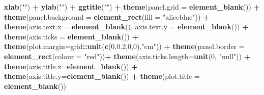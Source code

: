 \documentclass[12pt,twoside]{reedthesis}
\newenvironment{Shaded}{\begin{snugshade}}{\end{snugshade}}
\newcommand{\DataTypeTok}[1]{\textcolor[rgb]{0.13,0.29,0.53}{#1}}
\newcommand{\DecValTok}[1]{\textcolor[rgb]{0.00,0.00,0.81}{#1}}
\newcommand{\FloatTok}[1]{\textcolor[rgb]{0.00,0.00,0.81}{#1}}
\newcommand{\KeywordTok}[1]{\textcolor[rgb]{0.13,0.29,0.53}{\textbf{#1}}}
\newcommand{\NormalTok}[1]{#1}
\newcommand{\OperatorTok}[1]{\textcolor[rgb]{0.81,0.36,0.00}{\textbf{#1}}}
\newcommand{\StringTok}[1]{\textcolor[rgb]{0.31,0.60,0.02}{#1}}
\begin{document}
\begin{Shaded}
\begin{Highlighting}[]
\StringTok{  }\KeywordTok{xlab}\NormalTok{(}\StringTok{""}\NormalTok{) }\OperatorTok{+}\StringTok{ }
\StringTok{  }\KeywordTok{ylab}\NormalTok{(}\StringTok{""}\NormalTok{) }\OperatorTok{+}\StringTok{ }
\StringTok{  }\KeywordTok{ggtitle}\NormalTok{(}\StringTok{""}\NormalTok{) }\OperatorTok{+}
\StringTok{  }\KeywordTok{theme}\NormalTok{(}\DataTypeTok{panel.grid =} \KeywordTok{element_blank}\NormalTok{()) }\OperatorTok{+}\StringTok{ }
\StringTok{  }\KeywordTok{theme}\NormalTok{(}\DataTypeTok{panel.background =} \KeywordTok{element_rect}\NormalTok{(}\DataTypeTok{fill =} \StringTok{"aliceblue"}\NormalTok{)) }\OperatorTok{+}
\StringTok{  }\KeywordTok{theme}\NormalTok{(}\DataTypeTok{axis.text.x =} \KeywordTok{element_blank}\NormalTok{(), }\DataTypeTok{axis.text.y =} \KeywordTok{element_blank}\NormalTok{()) }\OperatorTok{+}
\StringTok{  }\KeywordTok{theme}\NormalTok{(}\DataTypeTok{axis.ticks =} \KeywordTok{element_blank}\NormalTok{()) }\OperatorTok{+}
\StringTok{  }\KeywordTok{theme}\NormalTok{(}\DataTypeTok{plot.margin=}\NormalTok{grid}\OperatorTok{::}\KeywordTok{unit}\NormalTok{(}\KeywordTok{c}\NormalTok{(}\DecValTok{0}\NormalTok{,}\FloatTok{0.2}\NormalTok{,}\DecValTok{0}\NormalTok{,}\DecValTok{0}\NormalTok{),}\StringTok{"cm"}\NormalTok{)) }\OperatorTok{+}\StringTok{ }
\StringTok{  }\KeywordTok{theme}\NormalTok{(}\DataTypeTok{panel.border =} \KeywordTok{element_rect}\NormalTok{(}\DataTypeTok{colour =} \StringTok{"red"}\NormalTok{))}\OperatorTok{+}
\StringTok{  }\KeywordTok{theme}\NormalTok{(}\DataTypeTok{axis.ticks.length=}\KeywordTok{unit}\NormalTok{(}\DecValTok{0}\NormalTok{, }\StringTok{"null"}\NormalTok{)) }\OperatorTok{+}
\StringTok{  }\KeywordTok{theme}\NormalTok{(}\DataTypeTok{axis.title.x=}\KeywordTok{element_blank}\NormalTok{()) }\OperatorTok{+}
\StringTok{  }\KeywordTok{theme}\NormalTok{(}\DataTypeTok{axis.title.y=}\KeywordTok{element_blank}\NormalTok{()) }\OperatorTok{+}
\StringTok{  }\KeywordTok{theme}\NormalTok{(}\DataTypeTok{plot.title =} \KeywordTok{element_blank}\NormalTok{())}
  

\end{Highlighting}
\end{Shaded}
\end{document}
